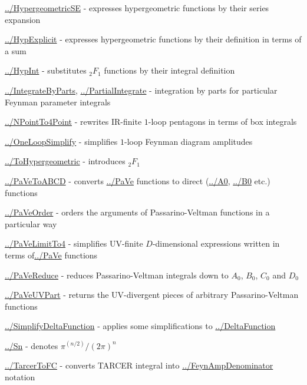 \documentclass[../FeynCalcManual.tex]{subfiles}
\begin{document}
\begin{itemize}
{\item
  \hyperlink{../hypergeometricse}{../HypergeometricSE} - expresses
  hypergeometric functions by their series expansion
\item
  \hyperlink{../hypexplicit}{../HypExplicit} - expresses hypergeometric
  functions by their definition in terms of a sum
\item
  \hyperlink{../hypint}{../HypInt} - substitutes \({}_2 F_1\) functions
  by their integral definition
\item
  \hyperlink{../integratebyparts}{../IntegrateByParts},
  \hyperlink{../partialintegrate}{../PartialIntegrate} - integration by
  parts for particular Feynman parameter integrals
\item
  \hyperlink{../npointto4point}{../NPointTo4Point} - rewrites IR-finite
  \(1\)-loop pentagons in terms of box integrals
\item
  \hyperlink{../oneloopsimplify}{../OneLoopSimplify} - simplifies
  \(1\)-loop Feynman diagram amplitudes
\item
  \hyperlink{../tohypergeometric}{../ToHypergeometric} - introduces
  \({}_2 F_1\)
\item
  \hyperlink{../pavetoabcd}{../PaVeToABCD} - converts
  \hyperlink{../pave}{../PaVe} functions to direct
  (\hyperlink{../a0}{../A0}, \hyperlink{../b0}{../B0} etc.) functions
\item
  \hyperlink{../paveorder}{../PaVeOrder} - orders the arguments of
  Passarino-Veltman functions in a particular way
\item
  \hyperlink{../pavelimitto4}{../PaVeLimitTo4} - simplifies UV-finite
  \(D\)-dimensional expressions written in terms
  of\hyperlink{../pave}{../PaVe} functions
\item
  \hyperlink{../pavereduce}{../PaVeReduce} - reduces Passarino-Veltman
  integrals down to \(A_0\), \(B_0\), \(C_0\) and \(D_0\)
\item
  \hyperlink{../paveuvpart}{../PaVeUVPart} - returns the UV-divergent
  pieces of arbitrary Passarino-Veltman functions
\item
  \hyperlink{../simplifydeltafunction}{../SimplifyDeltaFunction} -
  applies some simplifications to
  \hyperlink{../deltafunction}{../DeltaFunction}
\item
  \hyperlink{../sn}{../Sn} - denotes \(\pi^{(n/2)}/(2 \pi)^n\)
\item
  \hyperlink{../tarcertofc}{../TarcerToFC} - converts TARCER integral
  into \hyperlink{../feynampdenominator}{../FeynAmpDenominator} notation
\item
}
\end{itemize}
\end{document}
